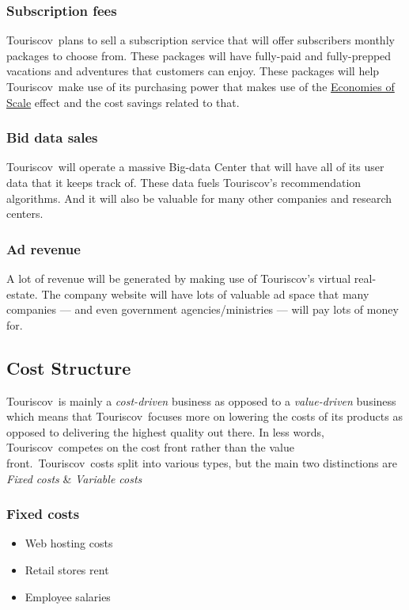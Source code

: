 \documentclass[12pt]{article}
\newcommand{\tco}{Touriscov}
\begin{document}
\subsubsection{Subscription fees}
\tco\ plans to sell a subscription service that will offer subscribers monthly packages to choose from. These packages will have fully-paid and fully-prepped vacations and adventures that customers can enjoy. These packages will help \tco\ make use of its purchasing power that makes use of the \href{https://www.wikiwand.com/en/Economies_of_scale}{Economies of Scale} effect and the cost savings related to that.

\subsubsection{Bid data sales}
\tco\ will operate a massive Big-data Center that will have all of its user data that it keeps track of. These data fuels Touriscov's recommendation algorithms. And it will also be valuable for many other companies and research centers.
\subsubsection{Ad revenue}
A lot of revenue will be generated by making use of Touriscov's virtual real-estate. The company website will have lots of valuable ad space that many companies --- and even government agencies/ministries --- will pay lots of money for.

\subsection{Cost Structure}
\tco\ is mainly a \textit{cost-driven} business as opposed to a \textit{value-driven} business which means that \tco\ focuses more on lowering the costs of its products as opposed to delivering the highest quality out there. In less words, \tco\ competes on the cost front rather than the value front.\ \tco\ costs split into various types, but the main two distinctions are \textit{Fixed costs} \& \textit{Variable costs}
\subsubsection{Fixed costs}
\begin{itemize}
    \item Web hosting costs
    \item Retail stores rent
    \item Employee salaries
\end{itemize}
\end{document}
